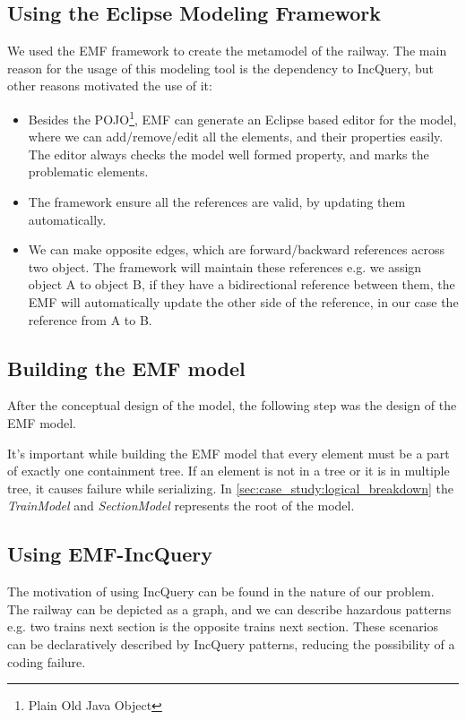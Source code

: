 \newpage

\subsection{Using the Eclipse Modeling Framework}

We used the EMF framework to create the metamodel of the railway. The main reason for the usage of this modeling tool is the dependency to IncQuery, but other reasons motivated the use of it:
\begin{itemize}
	\item Besides the POJO\footnote{Plain Old Java Object}, EMF can generate an Eclipse based editor for the model, where we can add/remove/edit all the elements, and their properties easily. The editor always checks the model well formed property, and marks the problematic elements.
	\item The framework ensure all the references are valid, by updating them automatically.
	\item We can make opposite edges, which are forward/backward references across two object. The framework will maintain these references e.g. we assign object A to object B, if they have a bidirectional reference between them, the EMF will automatically update the other side of the reference, in our case the reference from A to B.
\end{itemize}

\subsection{Building the EMF model}

After the conceptual design of the model, the following step was the design of the EMF model.

It's important while building the EMF model that every element must be a part of exactly one containment tree. If an element is not in a tree or it is in multiple tree, it causes failure while serializing. In \cref{sec:case_study:logical_breakdown} the \emph{TrainModel} and \emph{SectionModel} represents the root of the model.

\subsection{Using EMF-IncQuery}

The motivation of using IncQuery can be found in the nature of our problem. The railway can be depicted as a graph, and we can describe hazardous patterns e.g. two trains next section is the opposite trains next section. These scenarios can be declaratively described by IncQuery patterns, reducing the possibility of a coding failure. 

